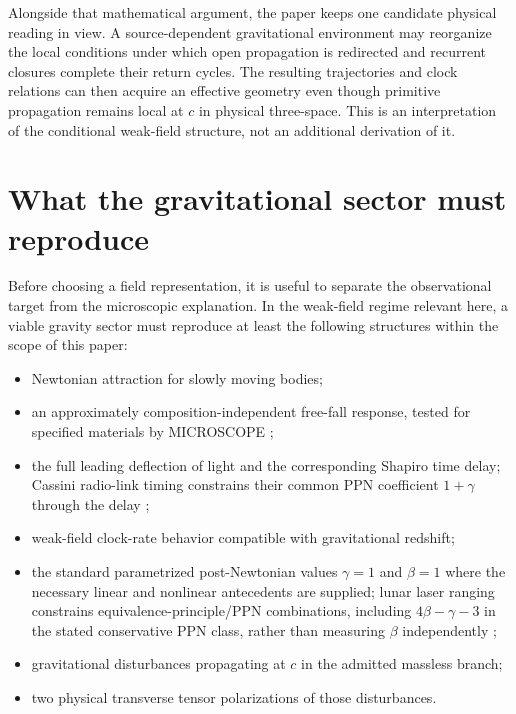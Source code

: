 \documentclass[11pt]{article}
\theoremstyle{plain}
\theoremstyle{remark}
\begin{document}
Alongside that mathematical argument, the paper keeps one candidate physical reading in
view.  A source-dependent gravitational environment may reorganize the local conditions
under which open propagation is redirected and recurrent closures complete their return
cycles.  The resulting trajectories and clock relations can then acquire an effective
geometry even though primitive propagation remains local at $c$ in physical three-space.
This is an interpretation of the conditional weak-field structure, not an additional
derivation of it.

\section{What the gravitational sector must reproduce}
\label{sec:targets}

Before choosing a field representation, it is useful to separate the observational target
from the microscopic explanation.  In the weak-field regime relevant here, a viable
gravity sector must reproduce at least the following structures within the scope of this
paper:
\begin{itemize}[leftmargin=*]
  \item Newtonian attraction for slowly moving bodies;
  \item an approximately composition-independent free-fall response, tested
        for specified materials by MICROSCOPE \cite{Touboul2022MICROSCOPE};
  \item the full leading deflection of light and the corresponding Shapiro time
        delay; Cassini radio-link timing constrains their common PPN coefficient
        $1+\gamma$ through the delay \cite{Bertotti2003Cassini};
  \item weak-field clock-rate behavior compatible with gravitational redshift;
  \item the standard parametrized post-Newtonian values $\gamma=1$ and $\beta=1$ where
        the necessary linear and nonlinear antecedents are supplied; lunar laser
        ranging constrains equivalence-principle/PPN combinations, including
        $4\beta-\gamma-3$ in the stated conservative PPN class, rather than
        measuring $\beta$ independently \cite{Williams2004LLR};
  \item gravitational disturbances propagating at $c$ in the admitted massless branch;
  \item two physical transverse tensor polarizations of those disturbances.
\end{itemize}
\end{document}
